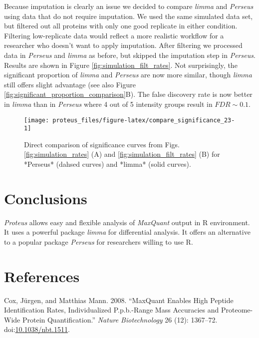 \documentclass[]{article}
\begin{document}
Because imputation is clearly an issue we decided to compare
\emph{limma} and \emph{Perseus} using data that do not require
imputation. We used the same simulated data set, but filtered out all
proteins with only one good replicate in either condition. Filtering
low-replicate data would reflect a more realistic workflow for a
researcher who doesn't want to apply imputation. After filtering we
processed data in \emph{Perseus} and \emph{limma} as before, but skipped
the imputation step in \emph{Perseus}. Results are shown in Figure
\ref{fig:simulation_filt_rates}. Not surprisingly, the significant
proportion of \emph{limma} and \emph{Perseus} are now more similar,
though \emph{limma} still offers slight advantage (see also Figure
\ref{fig:significant_proportion_comparison}B). The false discovery rate
is now better in \emph{limma} than in \emph{Perseus} where 4 out of 5
intensity groups result in \(FDR \sim 0.1\).

\begin{figure}[H]

{\centering \texttt{[image: proteus\_files/figure-latex/compare\_significance\_23-1]} 

}

\caption{\label{fig:significant_proportion_comparison}Direct comparison of significance curves from Figs. \ref{fig:simulation_rates} (A) and \ref{fig:simulation_filt_rates} (B) for *Perseus* (dahsed curves) and *limma* (solid curves).}\label{fig:compare_significance_23}
\end{figure}

\section{Conclusions}\label{conclusions}

\emph{Proteus} allows easy and flexible analysis of \emph{MaxQuant}
output in R environment. It uses a powerful package \emph{limma} for
differential analysis. It offers an alternative to a popular package
\emph{Perseus} for researchers willing to use R.

\section*{References}\label{references}

\hypertarget{refs}{}
\hypertarget{ref-coxmann2008}{}
Cox, Jürgen, and Matthias Mann. 2008. ``MaxQuant Enables High Peptide
Identification Rates, Individualized P.p.b.-Range Mass Accuracies and
Proteome-Wide Protein Quantification.'' \emph{Nature Biotechnology} 26
(12): 1367--72.
doi:\href{https://doi.org/10.1038/nbt.1511}{10.1038/nbt.1511}.
\end{document}
